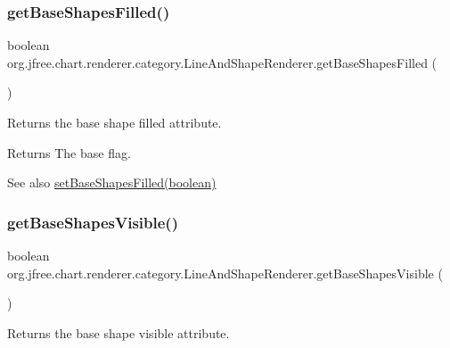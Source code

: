\subsubsection{\texorpdfstring{get\+Base\+Shapes\+Filled()}{getBaseShapesFilled()}}
{\footnotesize\ttfamily boolean org.\+jfree.\+chart.\+renderer.\+category.\+Line\+And\+Shape\+Renderer.\+get\+Base\+Shapes\+Filled (\begin{DoxyParamCaption}{ }\end{DoxyParamCaption})}

Returns the base \textquotesingle{}shape filled\textquotesingle{} attribute.

\begin{DoxyReturn}{Returns}
The base flag.
\end{DoxyReturn}
\begin{DoxySeeAlso}{See also}
\mbox{\hyperlink{classorg_1_1jfree_1_1chart_1_1renderer_1_1category_1_1_line_and_shape_renderer_a75097e3726320df2362f2dbbbb611f04}{set\+Base\+Shapes\+Filled(boolean)}} 
\end{DoxySeeAlso}
\mbox{\label{classorg_1_1jfree_1_1chart_1_1renderer_1_1category_1_1_line_and_shape_renderer_a2f676208b847d3847162f57419493426}} 
\subsubsection{\texorpdfstring{get\+Base\+Shapes\+Visible()}{getBaseShapesVisible()}}
{\footnotesize\ttfamily boolean org.\+jfree.\+chart.\+renderer.\+category.\+Line\+And\+Shape\+Renderer.\+get\+Base\+Shapes\+Visible (\begin{DoxyParamCaption}{ }\end{DoxyParamCaption})}

Returns the base \textquotesingle{}shape visible\textquotesingle{} attribute.

